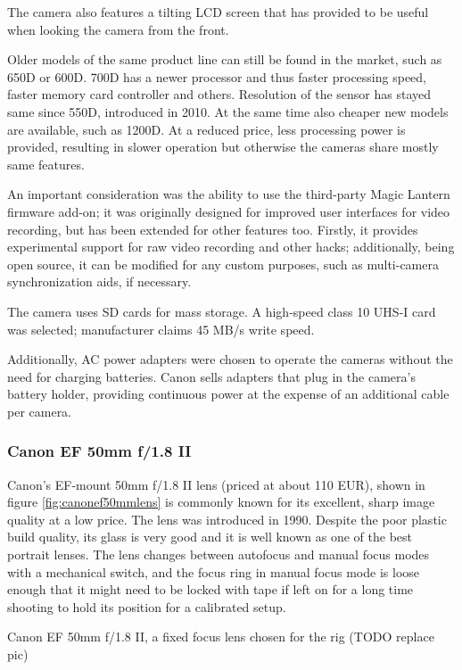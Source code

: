 The camera also features a tilting LCD screen that has provided to be useful when looking the camera from the front.

Older models of the same product line can still be found in the market, such as 650D or 600D. 700D has a newer processor and thus faster processing speed, faster memory card controller and others. Resolution of the sensor has stayed same since 550D, introduced in 2010.
At the same time also cheaper new models are available, such as 1200D. At a reduced price, less processing power is provided, resulting in slower operation but otherwise the cameras share mostly same features.

An important consideration was the ability to use the third-party Magic Lantern firmware add-on;
it was originally designed for improved user interfaces for video recording, but has been extended for other features too.
Firstly, it provides experimental support for raw video recording and other hacks; additionally, being open source, it can be modified for any custom purposes, such as multi-camera synchronization aids, if necessary.

The camera uses SD cards for mass storage. A high-speed class 10 UHS-I card was selected; manufacturer claims 45 MB/s write speed.

Additionally, AC power adapters were chosen to operate the cameras without the need for charging batteries.
Canon sells adapters that plug in the camera's battery holder, providing continuous power at the expense of an additional cable per camera.

\subsubsection{Canon EF 50mm f/1.8 II}

Canon's EF-mount 50mm f/1.8 II lens (priced at about 110 EUR), shown in figure \ref{fig:canonef50mmlens} is commonly known for its excellent, sharp image quality at a low price.
The lens was introduced in 1990.
Despite the poor plastic build quality, its glass is very good and it is well known as one of the best portrait lenses.
The lens changes between autofocus and manual focus modes with a mechanical switch, and the focus ring in manual focus mode is loose enough that it might need to be locked with tape if left on for a long time shooting to hold its position for a calibrated setup.

{Canon EF 50mm f/1.8 II, a fixed focus lens chosen for the rig (TODO replace pic)}

